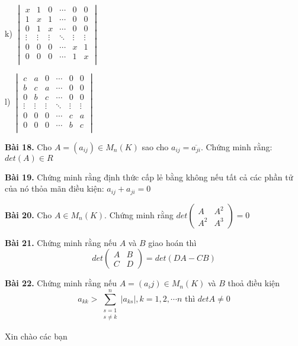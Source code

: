 \documentclass[12pt]{report}
\begin{document}
k) $\begin{vmatrix}
	x & 1 & 0 & \cdots & 0 & 0 \\
	1 & x & 1 & \cdots & 0 & 0 \\
	0 & 1 & x & \cdots & 0 & 0 \\
	\vdots & \vdots & \vdots & \ddots & \vdots & \vdots \\
	0 & 0 & 0 & \cdots & x & 1 \\
	0 & 0 & 0 & \cdots & 1 & x \\
\end{vmatrix}$

l) $\begin{vmatrix}
	c & a & 0 & \cdots & 0 & 0 \\
	b & c & a & \cdots & 0 & 0 \\
	0 & b & c & \cdots & 0 & 0 \\
	\vdots & \vdots & \vdots & \ddots & \vdots & \vdots \\
	0 & 0 & 0 & \cdots & c & a \\
	0 & 0 & 0 & \cdots & b & c \\
\end{vmatrix}$

\textbf{Bài 18.} Cho $A = \left( a_{ij}\right) \in M_n(K)$ sao cho $a_{ij} = \overline{a_{ji}}$. Chứng minh rằng: $det(A) \in R$

\textbf{Bài 19.} Chứng minh rằng định thức cấp lẻ bằng không nếu tất cả các phần tử của nó thỏa mãn điều kiện: $a_{ij} + a_{ji} = 0$

\textbf{Bài 20.} Cho $A \in M_n(K)$. Chứng minh rằng $det \begin{pmatrix}
	A & A^2 \\ A^2 & A^3 
\end{pmatrix} = 0$

\textbf{Bài 21.} Chứng minh rằng nếu $A$ và $B$ giao hoán thì 
\[ det \begin{pmatrix} A & B \\ C & D \end{pmatrix} = det(DA - CB) \]

\textbf{Bài 22.} Chứng minh rằng nếu $A = (a_ij) \in M_n(K)$ và $B$ thoả điều kiện \[ a_{kk} > \displaystyle \sum_{\substack{s=1 \\ s \neq k}}^n |a_{ks}|, k = 1, 2, \cdots n \text{ thì } detA \neq 0 \]

Xin chào các bạn
\end{document}

